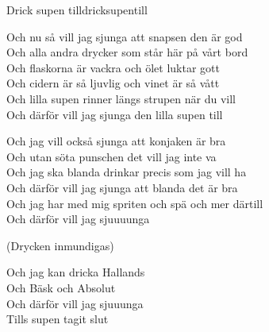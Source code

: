 \begin{song}{Drick supen till}{dricksupentill}
\begin{vers}
Och nu så vill jag sjunga att snapsen den är god\\
Och alla andra drycker som står här på vårt bord\\
Och flaskorna är vackra och ölet luktar gott\\
Och cidern är så ljuvlig och vinet är så vått\\
Och lilla supen rinner längs strupen när du vill\\
Och därför vill jag sjunga den lilla supen till\\
\end{vers}
\begin{vers}
Och jag vill också sjunga att konjaken är bra\\
Och utan söta punschen det vill jag inte va\\
Och jag ska blanda drinkar precis som jag vill ha\\
Och därför vill jag sjunga att blanda det är bra\\
Och jag har med mig spriten och spä och mer därtill\\
Och därför vill jag sjuuuunga\\
\end{vers}
\begin{vers}
(Drycken inmundigas)\\
\end{vers}
\begin{vers}
Och jag kan dricka Hallands\\
Och Bäsk och Absolut\\
Och därför vill jag sjuuunga\\
Tills supen tagit slut\\
\end{vers}
\end{song}
